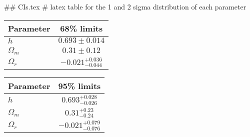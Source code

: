 ## CIs.tex
# latex table for the 1 and 2 sigma distribution of each parameter

\begin{tabular} { l  c}
 Parameter &  68\% limits\\
\hline
{\boldmath$h              $} & $0.693\pm 0.014            $\\
{\boldmath$\Omega_m       $} & $0.31\pm 0.12              $\\
{\boldmath$\Omega_r       $} & $-0.021^{+0.036}_{-0.044}  $\\
\hline
\end{tabular}

\begin{tabular} { l  c}
 Parameter &  95\% limits\\
\hline
{\boldmath$h              $} & $0.693^{+0.028}_{-0.026}   $\\
{\boldmath$\Omega_m       $} & $0.31^{+0.23}_{-0.24}      $\\
{\boldmath$\Omega_r       $} & $-0.021^{+0.079}_{-0.076}  $\\
\hline
\end{tabular}
